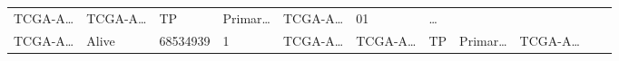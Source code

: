 \documentclass[
]{article}
\begin{document}
\begin{longtable}[]{@{}lllllllllll@{}}
\begin{minipage}[t]{0.07\columnwidth}
TCGA-A\ldots{}\strut
\end{minipage} & \begin{minipage}[t]{0.07\columnwidth}\raggedright
TCGA-A\ldots{}\strut
\end{minipage} & \begin{minipage}[t]{0.07\columnwidth}\raggedright
TP\strut
\end{minipage} & \begin{minipage}[t]{0.07\columnwidth}\raggedright
Primar\ldots{}\strut
\end{minipage} & \begin{minipage}[t]{0.09\columnwidth}\raggedright
TCGA-A\ldots{}\strut
\end{minipage} & \begin{minipage}[t]{0.10\columnwidth}\raggedright
01\strut
\end{minipage} & \begin{minipage}[t]{0.03\columnwidth}\raggedright
\ldots{}\strut
\end{minipage}\tabularnewline
\begin{minipage}[t]{0.07\columnwidth}\raggedright
TCGA-A\ldots{}\strut
\end{minipage} & \begin{minipage}[t]{0.04\columnwidth}\raggedright
Alive\strut
\end{minipage} & \begin{minipage}[t]{0.06\columnwidth}\raggedright
68534939\strut
\end{minipage} & \begin{minipage}[t]{0.07\columnwidth}\raggedright
1\strut
\end{minipage} & \begin{minipage}[t]{0.07\columnwidth}\raggedright
TCGA-A\ldots{}\strut
\end{minipage} & \begin{minipage}[t]{0.07\columnwidth}\raggedright
TCGA-A\ldots{}\strut
\end{minipage} & \begin{minipage}[t]{0.07\columnwidth}\raggedright
TP\strut
\end{minipage} & \begin{minipage}[t]{0.07\columnwidth}\raggedright
Primar\ldots{}\strut
\end{minipage} & \begin{minipage}[t]{0.09\columnwidth}\raggedright
TCGA-A\ldots{}\strut
\end{minipage} & \begin{minipage}[t]{0.10\columnwidth}\raggedright

\end{minipage}
\end{longtable}
\end{document}
